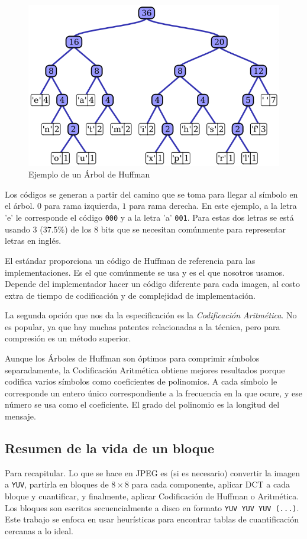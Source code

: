 \begin{figure}[h]
    \includegraphics[width=1.0\textwidth]{Huffman}
    \caption{Ejemplo de un Árbol de Huffman}
    \label{fig:huffman}
\end{figure}

Los códigos se generan a partir del camino que se toma para llegar al símbolo
en el árbol. $0$ para rama izquierda, $1$ para rama derecha. En este ejemplo, a
la letra 'e' le corresponde el código \verb+000+ y a la letra 'a' \verb+001+.
Para estas dos letras se está usando 3 ($37.5\%$) de los 8 bits que se
necesitan comúnmente para representar letras en inglés.

El estándar proporciona un código de Huffman de referencia para las
implementaciones. Es el que comúnmente se usa y es el que nosotros usamos.
Depende del implementador hacer un código diferente para cada imagen, al costo
extra de tiempo de codificación y de complejidad de implementación.

La segunda opción que nos da la especificación es la \emph{Codificación
Aritmética}. No es popular, ya que hay muchas patentes relacionadas a la
técnica, pero para compresión es un método superior.

Aunque los Árboles de Huffman son óptimos para comprimir símbolos
separadamente, la Codificación Aritmética obtiene mejores resultados porque
codifica varios símbolos como coeficientes de polinomios. A cada símbolo le
corresponde un entero único correspondiente a la frecuencia en la que ocure, y
ese número se usa como el coeficiente. El grado del polinomio es la longitud
del mensaje.

\subsection{Resumen de la vida de un bloque}

Para recapitular. Lo que se hace en JPEG es (si es necesario) convertir la
imagen a \verb+YUV+, partirla en bloques de $8\times8$ para cada componente,
aplicar DCT a cada bloque y cuantificar, y finalmente, aplicar Codificación de
Huffman o Aritmética. Los bloques son escritos secuencialmente a disco en
formato \verb+YUV YUV YUV (...)+. Este trabajo se enfoca en usar heurísticas
para encontrar tablas de cuantificación cercanas a lo ideal.

%
